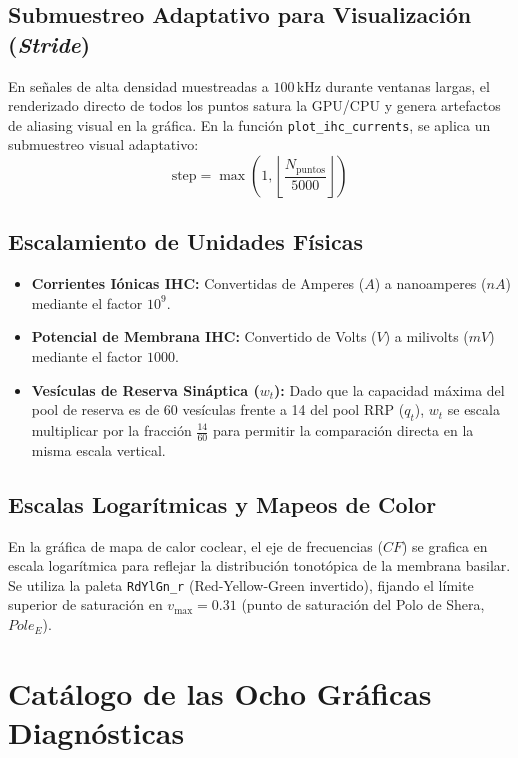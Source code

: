 \documentclass[12pt,a4paper]{article}
\begin{document}
\subsection{Submuestreo Adaptativo para Visualización (\emph{Stride})}
En señales de alta densidad muestreadas a $100\,\text{kHz}$ durante ventanas largas, el renderizado directo de todos los puntos satura la GPU/CPU y genera artefactos de aliasing visual en la gráfica. En la función \texttt{plot\_ihc\_currents}, se aplica un submuestreo visual adaptativo:
\begin{equation}
\text{step} = \max\left(1, \left\lfloor \frac{N_{\text{puntos}}}{5000} \right\rfloor \right)
\end{equation}

\subsection{Escalamiento de Unidades Físicas}
\begin{itemize}
    \item \textbf{Corrientes Iónicas IHC:} Convertidas de Amperes ($A$) a nanoamperes ($nA$) mediante el factor $10^9$.
    \item \textbf{Potencial de Membrana IHC:} Convertido de Volts ($V$) a milivolts ($mV$) mediante el factor $1000$.
    \item \textbf{Vesículas de Reserva Sináptica ($w_t$):} Dado que la capacidad máxima del pool de reserva es de 60 vesículas frente a 14 del pool RRP ($q_t$), $w_t$ se escala multiplicar por la fracción $\frac{14}{60}$ para permitir la comparación directa en la misma escala vertical.
\end{itemize}

\subsection{Escalas Logarítmicas y Mapeos de Color}
En la gráfica de mapa de calor coclear, el eje de frecuencias ($CF$) se grafica en escala logarítmica para reflejar la distribución tonotópica de la membrana basilar. Se utiliza la paleta \texttt{RdYlGn\_r} (Red-Yellow-Green invertido), fijando el límite superior de saturación en $v_{\max} = 0.31$ (punto de saturación del Polo de Shera, $Pole_E$).

\section{Catálogo de las Ocho Gráficas Diagnósticas}
\end{document}
